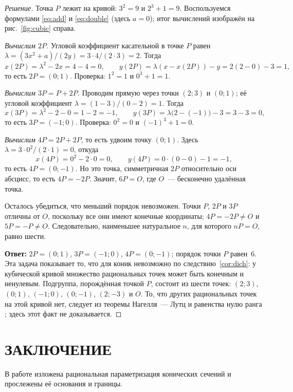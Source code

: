 \documentclass[a4paper,14pt]{extreport}
\theoremstyle{definition}
\newcommand{\answer}[1]{\par\medskip\noindent\textbf{Ответ:} #1}
\begin{document}
\begin{proof}[Решение]
\normalfont
Точка $P$ лежит на кривой: $3^2=9$ и $2^3+1=9$. Воспользуемся формулами
\eqref{eq:add} и \eqref{eq:double} (здесь $a=0$); итог вычислений изображён на рис.~\ref{fig:cubic} справа.

\emph{Вычислим $2P$.} Угловой коэффициент касательной в точке $P$ равен
$\lambda=(3x^2+a)/(2y)=3\cdot4/(2\cdot3)=2$. Тогда
\[
  x(2P)=\lambda^2-2x=4-4=0,\qquad y(2P)=\lambda(x-x(2P))-y=2(2-0)-3=1,
\]
то есть $2P=(0;1)$. Проверка: $1^2=1$ и $0^3+1=1$.

\emph{Вычислим $3P=P+2P$.} Проводим прямую через точки $(2;3)$ и $(0;1)$; её
угловой коэффициент $\lambda=(1-3)/(0-2)=1$. Тогда
\[
  x(3P)=\lambda^2-2-0=1-2=-1,\qquad y(3P)=\lambda\bigl(2-(-1)\bigr)-3=3-3=0,
\]
то есть $3P=(-1;0)$. Проверка: $0^2=0$ и $(-1)^3+1=0$.

\emph{Вычислим $4P=2P+2P$}, то есть удвоим точку $(0;1)$. Здесь
$\lambda=3\cdot0^2/(2\cdot1)=0$, откуда
\[
  x(4P)=0^2-2\cdot0=0,\qquad y(4P)=0\cdot(0-0)-1=-1,
\]
то есть $4P=(0;-1)$. Но это точка, симметричная $2P$ относительно оси абсцисс,
то есть $4P=-2P$. Значит, $6P=O$, где $O$~--- бесконечно удалённая точка.

Осталось убедиться, что меньший порядок невозможен. Точки $P$, $2P$ и $3P$
отличны от $O$, поскольку все они имеют конечные координаты; $4P=-2P\neq O$ и
$5P=-P\neq O$. Следовательно, наименьшее натуральное $n$, для которого $nP=O$,
равно шести.

\answer{$2P=(0;1)$, $3P=(-1;0)$, $4P=(0;-1)$; порядок точки $P$ равен~6. Эта
задача показывает то, что для коник невозможно по следствию~\ref{cor:dich}: у
кубической кривой множество рациональных точек может быть конечным и ненулевым.
Подгруппа, порождённая точкой $P$, состоит из шести точек: $(2;3)$, $(0;1)$,
$(-1;0)$, $(0;-1)$, $(2;-3)$ и $O$. То, что других рациональных точек на этой
кривой нет, следует из теоремы Нагелля~--- Лутц и равенства нулю ранга
\cite[гл.~II]{silverman}; здесь этот факт не доказывается.}
\end{proof}

\chapter*{ЗАКЛЮЧЕНИЕ}

В работе изложена рациональная параметризация конических сечений и прослежены её
основания и границы.
\end{document}
